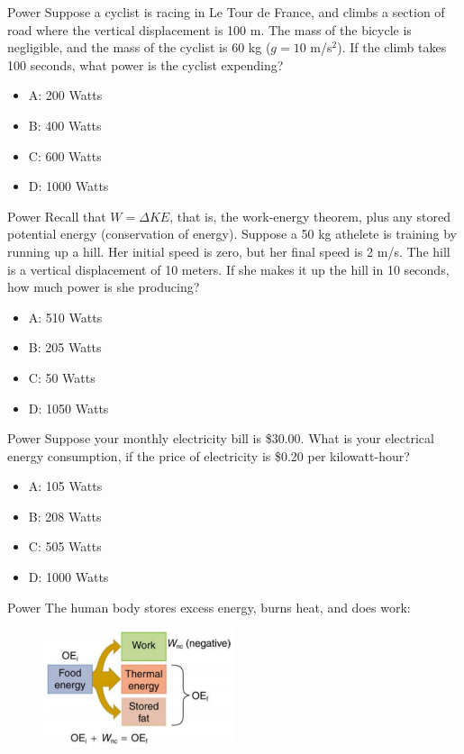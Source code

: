 \documentclass{beamer}
\begin{document}
\begin{frame}{Power}
Suppose a cyclist is racing in Le Tour de France, and climbs a section of road where the vertical displacement is 100 m.  The mass of the bicycle is negligible, and the mass of the cyclist is 60 kg ($g = 10$ m/s$^2$).  If the climb takes 100 seconds, what power is the cyclist expending?
\begin{itemize}
\item A: 200 Watts
\item B: 400 Watts
\item C: 600 Watts
\item D: 1000 Watts
\end{itemize}
\end{frame}

\begin{frame}{Power}
Recall that $W = \Delta KE$, that is, the work-energy theorem, plus any stored potential energy (conservation of energy).  Suppose a 50 kg athelete is training by running up a hill.  Her initial speed is zero, but her final speed is 2 m/s.  The hill is a vertical displacement of 10 meters.  If she makes it up the hill in 10 seconds, how much power is she producing?
\begin{itemize}
\item A: 510 Watts
\item B: 205 Watts
\item C: 50 Watts
\item D: 1050 Watts
\end{itemize}
\end{frame}

\begin{frame}{Power}
Suppose your monthly electricity bill is \$30.00.  What is your electrical energy consumption, if the price of electricity is \$0.20 per kilowatt-hour?
\begin{itemize}
\item A: 105 Watts
\item B: 208 Watts
\item C: 505 Watts
\item D: 1000 Watts
\end{itemize}
\end{frame}

\begin{frame}{Power}
The human body stores excess energy, burns heat, and does work:
\begin{figure}
\centering
\includegraphics[width=0.5\textwidth]{figures/body.png}
\end{figure}
\end{frame}
\end{document}
